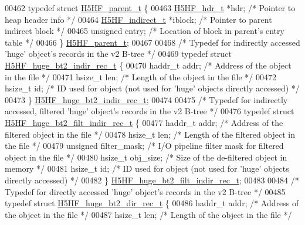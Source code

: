 \begin{DoxyCode}
00462 \textcolor{keyword}{typedef} \textcolor{keyword}{struct }\hyperlink{struct_h5_h_f__parent__t}{H5HF\_parent\_t} \{
00463     \hyperlink{struct_h5_h_f__hdr__t}{H5HF\_hdr\_t} *hdr;                \textcolor{comment}{/* Pointer to heap header info */}
00464     \hyperlink{struct_h5_h_f__indirect__t}{H5HF\_indirect\_t} *iblock;    \textcolor{comment}{/* Pointer to parent indirect block */}
00465     \textcolor{keywordtype}{unsigned} entry;             \textcolor{comment}{/* Location of block in parent's entry table */}
00466 \} \hyperlink{struct_h5_h_f__parent__t}{H5HF\_parent\_t};
00467 
00468 \textcolor{comment}{/* Typedef for indirectly accessed 'huge' object's records in the v2 B-tree */}
00469 \textcolor{keyword}{typedef} \textcolor{keyword}{struct }\hyperlink{struct_h5_h_f__huge__bt2__indir__rec__t}{H5HF\_huge\_bt2\_indir\_rec\_t} \{
00470     haddr\_t addr;       \textcolor{comment}{/* Address of the object in the file */}
00471     hsize\_t len;        \textcolor{comment}{/* Length of the object in the file */}
00472     hsize\_t id;         \textcolor{comment}{/* ID used for object (not used for 'huge' objects directly accessed) */}
00473 \} \hyperlink{struct_h5_h_f__huge__bt2__indir__rec__t}{H5HF\_huge\_bt2\_indir\_rec\_t};
00474 
00475 \textcolor{comment}{/* Typedef for indirectly accessed, filtered 'huge' object's records in the v2 B-tree */}
00476 \textcolor{keyword}{typedef} \textcolor{keyword}{struct }\hyperlink{struct_h5_h_f__huge__bt2__filt__indir__rec__t}{H5HF\_huge\_bt2\_filt\_indir\_rec\_t} \{
00477     haddr\_t addr;       \textcolor{comment}{/* Address of the filtered object in the file */}
00478     hsize\_t len;        \textcolor{comment}{/* Length of the filtered object in the file */}
00479     \textcolor{keywordtype}{unsigned} filter\_mask;   \textcolor{comment}{/* I/O pipeline filter mask for filtered object in the file */}
00480     hsize\_t obj\_size;   \textcolor{comment}{/* Size of the de-filtered object in memory */}
00481     hsize\_t id;         \textcolor{comment}{/* ID used for object (not used for 'huge' objects directly accessed) */}
00482 \} \hyperlink{struct_h5_h_f__huge__bt2__filt__indir__rec__t}{H5HF\_huge\_bt2\_filt\_indir\_rec\_t};
00483 
00484 \textcolor{comment}{/* Typedef for directly accessed 'huge' object's records in the v2 B-tree */}
00485 \textcolor{keyword}{typedef} \textcolor{keyword}{struct }\hyperlink{struct_h5_h_f__huge__bt2__dir__rec__t}{H5HF\_huge\_bt2\_dir\_rec\_t} \{
00486     haddr\_t addr;       \textcolor{comment}{/* Address of the object in the file */}
00487     hsize\_t len;        \textcolor{comment}{/* Length of the object in the file */}

\end{DoxyCode}
